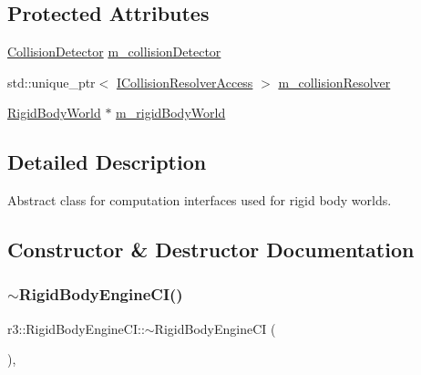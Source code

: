 \subsection*{Protected Attributes}
\begin{DoxyCompactItemize}
\item 
\mbox{\hyperlink{classr3_1_1_collision_detector}{Collision\+Detector}} \mbox{\hyperlink{classr3_1_1_rigid_body_engine_c_i_adb37ed2c686594f9504680be76c2dcbc}{m\+\_\+collision\+Detector}}
\item 
std\+::unique\+\_\+ptr$<$ \mbox{\hyperlink{classr3_1_1_i_collision_resolver_access}{I\+Collision\+Resolver\+Access}} $>$ \mbox{\hyperlink{classr3_1_1_rigid_body_engine_c_i_a27f09a82ab77919c2fb78869f6d3c035}{m\+\_\+collision\+Resolver}}
\item 
\mbox{\hyperlink{classr3_1_1_rigid_body_world}{Rigid\+Body\+World}} $\ast$ \mbox{\hyperlink{classr3_1_1_rigid_body_engine_c_i_afd7ae3fcba8b88ec6c31f2df56aae3f6}{m\+\_\+rigid\+Body\+World}}
\end{DoxyCompactItemize}


\subsection{Detailed Description}
Abstract class for computation interfaces used for rigid body worlds. 

\subsection{Constructor \& Destructor Documentation}
\mbox{\label{classr3_1_1_rigid_body_engine_c_i_a9f75c8c49e987206554b09550d93b341}} 
\subsubsection{\texorpdfstring{$\sim$\+Rigid\+Body\+Engine\+C\+I()}{~RigidBodyEngineCI()}}
{\footnotesize\ttfamily r3\+::\+Rigid\+Body\+Engine\+C\+I\+::$\sim$\+Rigid\+Body\+Engine\+CI (\begin{DoxyParamCaption}{ }\end{DoxyParamCaption})\hspace{0.3cm}{\ttfamily [virtual]}, {\ttfamily [default]}}

